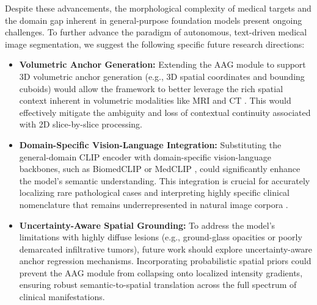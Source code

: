 \documentclass[onecolumn]{IEEEtran}
\numberwithin{equation}{section}
\theoremstyle{definition}
\theoremstyle{remark}
\begin{document}
Despite these advancements, the morphological complexity of medical targets and the domain gap inherent in general-purpose foundation models present ongoing challenges. To further advance the paradigm of autonomous, text-driven medical image segmentation, we suggest the following specific future research directions:

\begin{itemize}
    \item \textbf{Volumetric Anchor Generation:} Extending the AAG module to support 3D volumetric anchor generation (e.g., 3D spatial coordinates and bounding cuboids) would allow the framework to better leverage the rich spatial context inherent in volumetric modalities like MRI and CT \cite{konya2020ct}. This would effectively mitigate the ambiguity and loss of contextual continuity associated with 2D slice-by-slice processing.
    \item \textbf{Domain-Specific Vision-Language Integration:} Substituting the general-domain CLIP encoder with domain-specific vision-language backbones, such as BiomedCLIP \cite{zhang2025biomedclip} or MedCLIP \cite{wang2022medclip}, could significantly enhance the model's semantic understanding. This integration is crucial for accurately localizing rare pathological cases and interpreting highly specific clinical nomenclature that remains underrepresented in natural image corpora \cite{bommasani2022opportunities, lee2024foundation}.
    \item \textbf{Uncertainty-Aware Spatial Grounding:} To address the model's limitations with highly diffuse lesions (e.g., ground-glass opacities or poorly demarcated infiltrative tumors), future work should explore uncertainty-aware anchor regression mechanisms. Incorporating probabilistic spatial priors \cite{wang2023visual} could prevent the AAG module from collapsing onto localized intensity gradients, ensuring robust semantic-to-spatial translation across the full spectrum of clinical manifestations.
\end{itemize}



\end{document}
